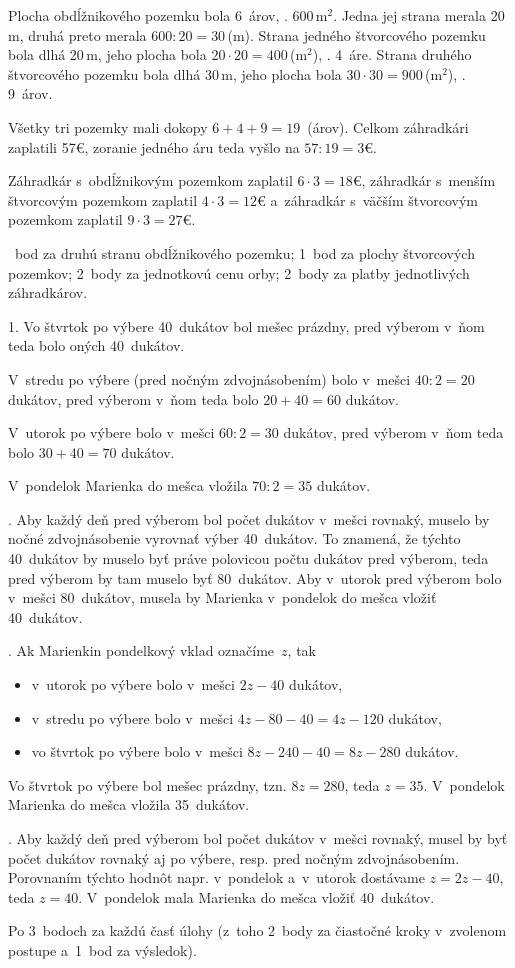 {%
Plocha obdĺžnikového pozemku bola 6~árov, \tj. 600\,m$^2$.
Jedna jej strana merala 20\,m, druhá preto merala $600:20=30$\,(m).
Strana jedného štvorcového pozemku bola dlhá 20\,m, jeho plocha bola $20\cdot 20=400$\,(m$^2$), \tj. 4~áre.
Strana druhého štvorcového pozemku bola dlhá 30\,m, jeho plocha bola $30\cdot 30=900$\,(m$^2$), \tj. 9~árov.

Všetky tri pozemky mali dokopy $6+4+9=19$~(árov).
Celkom záhradkári zaplatili 57€, zoranie jedného áru teda vyšlo na $57:19=3$€.

Záhradkár s~obdĺžnikovým pozemkom zaplatil $6\cdot 3=18$€,
záhradkár s~menším štvorcovým pozemkom zaplatil $4\cdot 3=12$€ a~záhradkár s~väčším štvorcovým pozemkom zaplatil $9\cdot 3=27$€.

~bod za druhú stranu obdĺžnikového pozemku;
1~bod za plochy štvorcových pozemkov;
2~body za jednotkovú cenu orby;
2~body za platby jednotlivých záhradkárov.
\endhodnotenie
}

{%
1.
Vo štvrtok po výbere 40~dukátov bol mešec prázdny, pred výberom v~ňom teda bolo oných 40~dukátov.

V~stredu po výbere (pred nočným zdvojnásobením) bolo v~mešci $40:2=20$ dukátov, pred výberom v~ňom teda bolo $20+40=60$ dukátov.

V~utorok po výbere bolo v~mešci $60:2=30$ dukátov, pred výberom v~ňom teda bolo $30+40=70$ dukátov.

V~pondelok Marienka do mešca vložila $70:2=35$ dukátov.

.
Aby každý deň pred výberom bol počet dukátov v~mešci rovnaký, muselo by nočné zdvojnásobenie vyrovnať výber 40~dukátov.
To znamená, že týchto 40~dukátov by muselo byť práve polovicou počtu dukátov pred výberom,
teda pred výberom by tam muselo byť 80~dukátov.
Aby v~utorok pred výberom bolo v~mešci 80~dukátov, musela by Marienka v~pondelok do mešca vložiť 40~dukátov.

.
Ak Marienkin pondelkový vklad označíme~$z$, tak
\begin{itemize}
\item v~utorok po výbere bolo v~mešci $2z-40$ dukátov,
\item v~stredu po výbere bolo v~mešci $4z-80-40=4z-120$ dukátov,
\item vo štvrtok po výbere bolo v~mešci $8z-240-40=8z-280$ dukátov.
\end{itemize}
Vo štvrtok po výbere bol mešec prázdny, tzn. $8z=280$, teda $z=35$.
V~pondelok Marienka do mešca vložila 35~dukátov.

.
Aby každý deň pred výberom bol počet dukátov v~mešci rovnaký, musel by byť počet dukátov rovnaký aj po výbere, resp. pred nočným zdvojnásobením.
Porovnaním týchto hodnôt napr. v~pondelok a~v~utorok dostávame
$z=2z-40$, teda $z=40$.
V~pondelok mala Marienka do mešca vložiť 40~dukátov.

\hodnotenie
Po 3~bodoch za každú časť úlohy (z~toho 2~body za čiastočné kroky v~zvolenom postupe a~1~bod za výsledok).
\endhodnotenie
}

